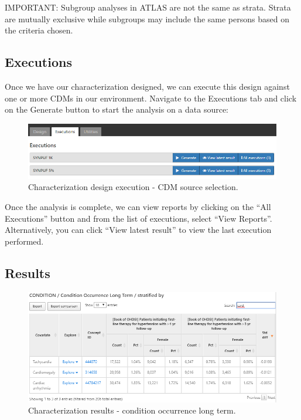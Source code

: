 \documentclass[11pt]{book}
\theoremstyle{definition}
\theoremstyle{definition}
\theoremstyle{definition}
\theoremstyle{remark}
\let\BeginKnitrBlock\begin \let\EndKnitrBlock\end
\begin{document}
\BeginKnitrBlock{rmdimportant}
IMPORTANT: Subgroup analyses in ATLAS are not the same as strata. Strata are mutually exclusive while subgroups may include the same persons based on the criteria chosen.
\EndKnitrBlock{rmdimportant}

\hypertarget{executions}{%
\subsection{Executions}\label{executions}}

Once we have our characterization designed, we can execute this design against one or more CDMs in our environment. Navigate to the Executions tab and click on the Generate button to start the analysis on a data source:

\begin{figure}

{\centering \includegraphics[width=1\linewidth]{images/Characterization/atlasCharacterizationExecutions} 

}

\caption{Characterization design execution - CDM source selection.}\label{fig:atlasCharacterizationExecutions}
\end{figure}

Once the analysis is complete, we can view reports by clicking on the ``All Executions'' button and from the list of executions, select ``View Reports''. Alternatively, you can click ``View latest result'' to view the last execution performed.

\hypertarget{results}{%
\subsection{Results}\label{results}}

\begin{figure}

{\centering \includegraphics[width=1\linewidth]{images/Characterization/atlasCharacterizationResultsSummary} 

}

\caption{Characterization results - condition occurrence long term.}\label{fig:atlasCharacterizationResultsSummary}
\end{figure}
\end{document}
